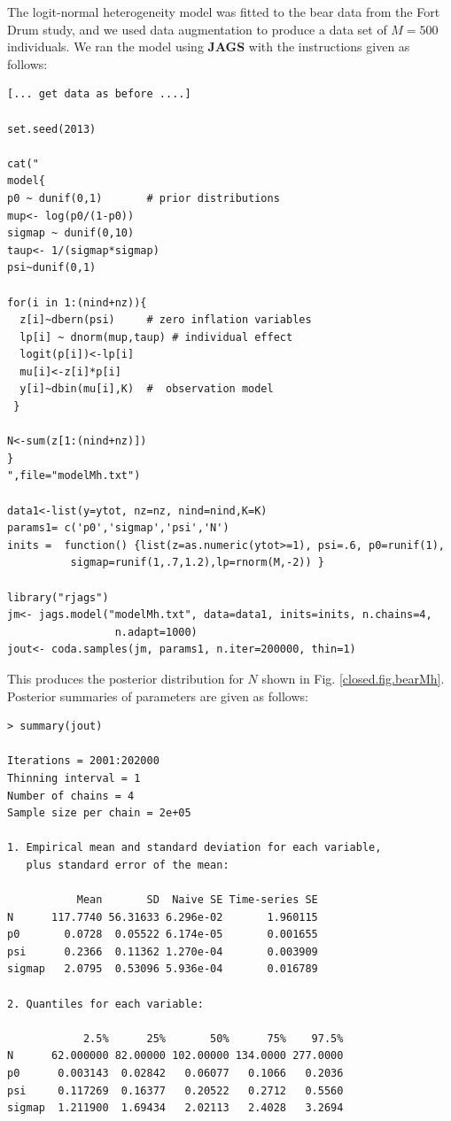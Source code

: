 The logit-normal heterogeneity model was fitted to the bear data from
the Fort Drum study, and we used data augmentation to produce a data
set of $M=500$ individuals.  We ran the model using {\bf JAGS} with
the instructions given as follows:
{\small
\begin{verbatim}
[... get data as before ....]

set.seed(2013)

cat("
model{
p0 ~ dunif(0,1)       # prior distributions
mup<- log(p0/(1-p0))
sigmap ~ dunif(0,10)
taup<- 1/(sigmap*sigmap)
psi~dunif(0,1)

for(i in 1:(nind+nz)){
  z[i]~dbern(psi)     # zero inflation variables
  lp[i] ~ dnorm(mup,taup) # individual effect
  logit(p[i])<-lp[i]
  mu[i]<-z[i]*p[i]
  y[i]~dbin(mu[i],K)  #  observation model
 }

N<-sum(z[1:(nind+nz)])
}
",file="modelMh.txt")

data1<-list(y=ytot, nz=nz, nind=nind,K=K) 
params1= c('p0','sigmap','psi','N')
inits =  function() {list(z=as.numeric(ytot>=1), psi=.6, p0=runif(1),
          sigmap=runif(1,.7,1.2),lp=rnorm(M,-2)) }

library("rjags")
jm<- jags.model("modelMh.txt", data=data1, inits=inits, n.chains=4,
                 n.adapt=1000)
jout<- coda.samples(jm, params1, n.iter=200000, thin=1)
\end{verbatim}
}
This produces the posterior distribution for $N$ shown
in Fig. \ref{closed.fig.bearMh}. Posterior summaries of parameters are
given as follows:
{\small
\begin{verbatim}
> summary(jout)

Iterations = 2001:202000
Thinning interval = 1 
Number of chains = 4 
Sample size per chain = 2e+05 

1. Empirical mean and standard deviation for each variable,
   plus standard error of the mean:

           Mean       SD  Naive SE Time-series SE
N      117.7740 56.31633 6.296e-02       1.960115
p0       0.0728  0.05522 6.174e-05       0.001655
psi      0.2366  0.11362 1.270e-04       0.003909
sigmap   2.0795  0.53096 5.936e-04       0.016789

2. Quantiles for each variable:

            2.5%      25%       50%      75%    97.5%
N      62.000000 82.00000 102.00000 134.0000 277.0000
p0      0.003143  0.02842   0.06077   0.1066   0.2036
psi     0.117269  0.16377   0.20522   0.2712   0.5560
sigmap  1.211900  1.69434   2.02113   2.4028   3.2694
\end{verbatim}
}



